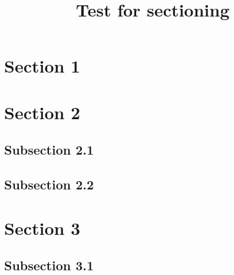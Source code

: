 \usepackage{blindtext}

\title{Test for sectioning}
\author{}
\date{}


\maketitle
\tableofcontents



\blindtext

\section{Section 1}

\blindtext

\section{Section 2}

\subsection{Subsection 2.1}

\blindtext

\subsection{Subsection 2.2}

\blindtext

\section{Section 3}

\blindtext

\subsection{Subsection 3.1}

